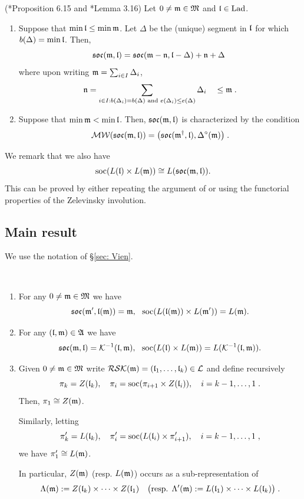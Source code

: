 \documentclass{ert-l} %
\begin{document}
\begin{proposition} (\cite{MR3573961}*{Proposition 6.15} and \cite{MR3866895}*{Lemma 3.16}) \label{prop: lm}
Let $0\ne\mathfrak{m}\in\mathfrak{M}$ and $\mathfrak{l}\in \operatorname{Lad}$.
\begin{enumerate}
\item Suppose that $\min\mathfrak{l}\le\min \mathfrak{m}$.
Let $\Delta$ be the (unique) segment in $\mathfrak{l}$ for which $b(\Delta) = \min \mathfrak{l}$.
Then,
\[
\mathfrak{soc}(\mathfrak{m},\mathfrak{l}) = \mathfrak{soc}( \mathfrak{m} -\mathfrak{n} , \mathfrak{l} - \Delta ) + \mathfrak{n} + \Delta\;
\]
where upon writing $\mathfrak{m} = \sum_{i\in I} \Delta_i$,
\[
\mathfrak{n} = \sum_{i\in I:b(\Delta_i) = b(\Delta)\text{ and }e(\Delta_i)\le e(\Delta)} \Delta_i\quad \leq \mathfrak{m} \;.
\]
\item
Suppose that $\min \mathfrak{m} < \min\mathfrak{l}$. Then, $\mathfrak{soc}(\mathfrak{m},\mathfrak{l})$ is characterized by the condition
\[
\mathcal{MW}(\mathfrak{soc}(\mathfrak{m},\mathfrak{l})) = \big(\mathfrak{soc}(\mathfrak{m}^{\dagger}, \mathfrak{l}) , \Delta^{\circ}(\mathfrak{m})\big)\;.
\]
\end{enumerate}
\end{proposition}

We remark that we also have
\[
\operatorname{soc}(L(\mathfrak{l})\times L(\mathfrak{m})) \cong L(\mathfrak{soc}(\mathfrak{m},\mathfrak{l})).
\]
This can be proved by either repeating the argument of \cite{MR3573961} or
using the functorial properties of the Zelevinsky involution.

\subsection{Main result}
We use the notation of \S\ref{sec: Vien}.

\begin{theorem} ~ \label{thm: main}
\begin{enumerate}
\item For any $0\neq \mathfrak{m}\in\mathfrak{M}$ we have
\[
\socm(\drv\m,\ldrr{\m})=\m,\ \ \soc(L(\ldrr{\m})\times L(\drv\m))=L(\m).
\]
\item For any $(\mathfrak{l},\mathfrak{m})\in\mathfrak{A}$ we have
\[
\socm(\m,\la)=\Vien^{-1}(\la,\m),\ \ \soc(L(\la)\times L(\m))=L(\Vien^{-1}(\la,\m)).
\]
\item Given $0\neq\mathfrak{m}\in \mathfrak{M}$ write $\mathcal{RSK}(\mathfrak{m})=(\mathfrak{l}_1,\dots,\mathfrak{l}_k)\in\mathcal{L}$
and define recursively
\[
\pi_k=Z(\mathfrak{l}_k), \quad \pi_i=\operatorname{soc}(\pi_{i+1}\times Z(\mathfrak{l}_i)),\quad i=k-1,\dots,1\;.
\]
Then, $\pi_1 \cong Z(\mathfrak{m})$.

Similarly, letting
\[
\pi'_k=L(\mathfrak{l}_k),\quad \pi'_i=\operatorname{soc}(L(\mathfrak{l}_i)\times\pi'_{i+1}),\quad i=k-1,\dots,1\;,
\]
we have $\pi'_1\cong L(\mathfrak{m})$.

In particular, $Z(\mathfrak{m})$ (resp. $L(\mathfrak{m})$) occurs as a sub-representation of
\begin{equation} \label{def: std}
\Lambda(\mathfrak{m}):= Z(\mathfrak{l}_k)\times\cdots\times Z(\mathfrak{l}_1)\quad \big( \mbox{resp. }\Lambda'(\mathfrak{m}):= L(\mathfrak{l}_1)\times\cdots\times L(\mathfrak{l}_k)\big)\;.
\end{equation}
\end{enumerate}
\end{theorem}
\end{document}
